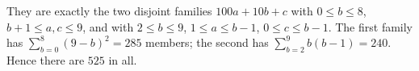 They are exactly the two disjoint families $100a+10b+c$ with $0\le b\le8$, $b+1\le a,c\le9$, and with $2\le b\le9$, $1\le a\le b-1$, $0\le c\le b-1$. The first family has $\sum_{b=0}^8(9-b)^2=285$ members; the second has $\sum_{b=2}^9b(b-1)=240$. Hence there are $\boxed{525}$ in all.
